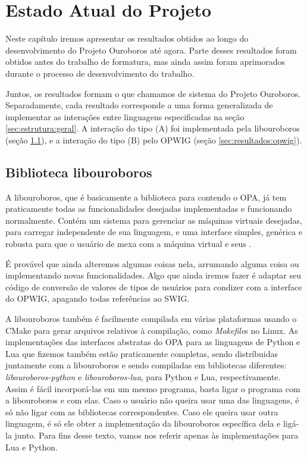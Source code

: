 \chapter{Estado Atual do Projeto}
\label{sec:resultados}

Neste capítulo iremos apresentar os resultados obtidos ao longo do
desenvolvimento do Projeto Ouroboros até agora. Parte desses resultados foram
obtidos antes do trabalho de formatura, mas ainda assim foram aprimorados
durante o processo de desenvolvimento do trabalho.

Juntos, os resultados formam o que chamamos de sistema do Projeto Ouroboros.
Separadamente, cada resultado corresponde a uma forma generalizada de implementar
as interações entre linguagens especificadas na seção \ref{sec:estrutura:geral}.
A interação do tipo (A) foi implementada pela libouroboros (seção 
\ref{sec:resultados:libouroboros}), e a interação do tipo (B) pelo 
OPWIG (seção \ref{sec:resultados:opwig}).


\section{Biblioteca \textbf{libouroboros}}
\label{sec:resultados:libouroboros}
A libouroboros, que é basicamente a biblioteca para \CXX{} contendo o OPA,
já tem praticamente todas as funcionalidades desejadas implementadas e
funcionando normalmente. Contém um sistema para gerenciar as máquinas
virtuais desejadas, para carregar  independente de sua
linguagem, e uma interface simples, genérica e robusta para
que o usuário de \CXX{} mexa com a máquina virtual e seus .

É provável que ainda alteremos algumas coisas nela, arrumando alguma
coisa ou implementando novas funcionalidades. Algo que ainda iremos
fazer é adaptar seu código de conversão de valores de tipos de usuários
para condizer com a interface do OPWIG, apagando todas referências ao
SWIG.

A libouroboros também é facilmente compilada em várias plataformas usando
o CMake para gerar arquivos relativos à compilação, como \textit{Makefile}s
no Linux. As implementações das interfaces abstratas do OPA para as linguagens
de \script{} Python e Lua que fizemos também estão praticamente completas,
sendo distríbuidas juntamente com a libouroboros e sendo compiladas em
bibliotecas diferentes: \emph{libouroboros-python} e \emph{libouroboros-lua},
para Python e Lua, respectivamente. Assim é fácil incorporá-las em um
mesmo programa, basta ligar o programa com a libouroboros e com elas. 
Caso o usuário não queira usar uma das linguagens, é só não ligar com 
as bibliotecas correspondentes. Caso ele queira usar outra linguagem, é
só ele obter a implementação da libouroboros específica dela e ligá-la junto.
Para fins desse texto, vamos nos referir apenas às implementações para
Lua e Python.

